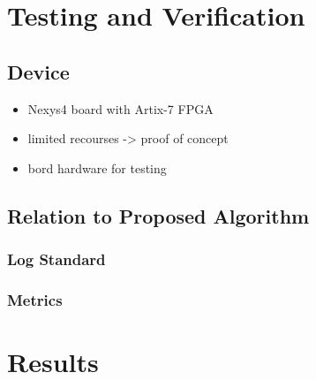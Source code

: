 \documentclass[mscthesis]{usiinfthesis}
\begin{document}
\chapter{Testing and Verification}
\label{ch:test}

\section{Device}
\label{ch:test_dev}

\begin{itemize}
    \item Nexys4 board with Artix-7 FPGA
    \item limited recourses -> proof of concept
    \item bord hardware for testing
\end{itemize}

\section{Relation to Proposed Algorithm}
\label{ch:test_prop}

\subsection{Log Standard}

\subsection{Metrics}

\chapter{Results}
\label{ch:res}
\end{document}
